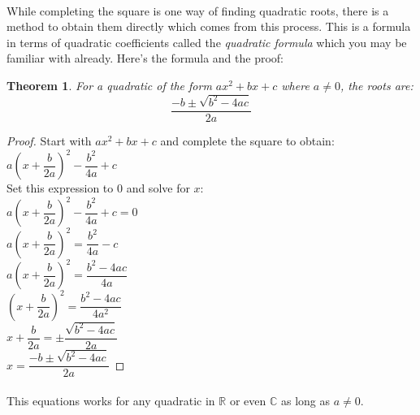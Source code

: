 \documentclass[12pt, a4paper, titlepage, twoside]{article}
\newcommand*{\R}{\mathbb{R}}
\newcommand*{\C}{\mathbb{C}}
\newtheorem*{theorem*}{Theorem}
\begin{document}
	\paragraph{}
	While completing the square is one way of finding quadratic roots, there is a method to obtain them directly which comes from this 
	process. This is a formula in terms of quadratic coefficients called the \textit{quadratic formula} which you may be familiar with already. 
	Here's the formula and the proof:\\
	
	\begin{pf}
		\begin{theorem*}
			For a quadratic of the form $ax^2 + bx + c$ where $a \neq  0$, the roots are:
			$$\dfrac{-b \pm \sqrt{b^2 - 4ac}}{2a}$$
		\end{theorem*}
		
		\tcbline	
		
		\begin{proof}
			Start with $ax^2 + bx + c$ and complete the square to obtain:\\
			
			$a\left(x+\dfrac{b}{2a}\right)^2 - \dfrac{b^2}{4a} + c$\\
			
			Set this expression to 0 and solve for $x$:\\
			
			$a\left(x+\dfrac{b}{2a}\right)^2 - \dfrac{b^2}{4a} + c = 0$\\
			
			$a\left(x+\dfrac{b}{2a}\right)^2 = \dfrac{b^2}{4a} - c$\\
			
			$a\left(x+\dfrac{b}{2a}\right)^2 = \dfrac{b^2 - 4ac}{4a}$\\
			
			$\left(x+\dfrac{b}{2a}\right)^2 = \dfrac{b^2 - 4ac}{4a^2}$\\
			
			$x+\dfrac{b}{2a} = \pm \dfrac{\sqrt{b^2 - 4ac}}{2a}$\\
			
			$x = \dfrac{-b \pm \sqrt{b^2 - 4ac}}{2a}$
		\end{proof}
	\end{pf}
	
	\paragraph{}
	This equations works for any quadratic in $\R$ or even $\C$ as long as $a \neq 0$.
	
\end{document}
